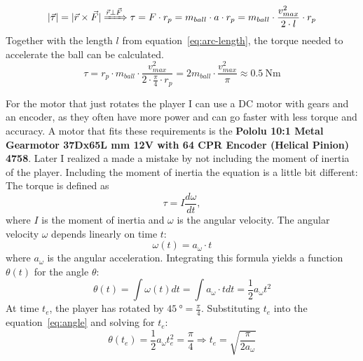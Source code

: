 \begin{equation}
    \label{eq:torque_shoot}
    |\vec{\tau}| = |\vec{r} \times \vec{F}| \xRightarrow{\vec{r} \perp \vec{F}} \tau = F \cdot r_p = m_{ball} \cdot a \cdot r_p = m_{ball} \cdot \frac{v_{max}^2}{2 \cdot l} \cdot r_p
\end{equation}
Together with the length $l$ from equation~\ref{eq:arc-length}, the torque needed to accelerate the ball can be calculated.
\begin{equation}
    \label{eq:torque_shoot_substituted}
    \tau = r_p \cdot m_{ball} \cdot \frac{v_{max}^2}{2\cdot\frac{\pi}{4}\cdot r_p} = 2m_{ball} \cdot \frac{v_{max}^2}{\pi} \approx \qty[per-mode=symbol]{0.5}{\N\m}
\end{equation}



For the motor that just rotates the player I can use a DC motor with gears and an encoder, as they often have more power and can go faster with less torque and accuracy.
A motor that fits these requirements is the \textbf{Pololu 10:1 Metal Gearmotor 37Dx65L mm 12V with 64 CPR Encoder (Helical Pinion) 4758}\autocite{pololu-dc}.
Later I realized a made a mistake by not including the moment of inertia of the player.
Including the moment of inertia the equation is a little bit different:
The torque is defined as
\begin{equation}
    \label{eq:torque2}
    \tau = I \frac{d\omega}{dt},
\end{equation}
where $I$ is the moment of inertia and $\omega$ is the angular velocity.
The angular velocity $\omega$ depends linearly on time $t$:
\begin{equation}
    \label{eq:angular_velocity}
    \omega(t) = a_\omega \cdot t
\end{equation}
where $a_\omega$ is the angular acceleration.
Integrating this formula yields a function $\theta(t)$ for the angle $\theta$:
\begin{equation}
    \label{eq:angle}
    \theta(t) = \int \omega(t)dt = \int a_\omega \cdot t dt = \frac{1}{2} a_\omega t^2
\end{equation}
At time $t_e$, the player has rotated by $\qty[per-mode=symbol]{45}{\degree} = \frac{\pi}{4}$.
Substituting $t_e$ into the equation~\ref{eq:angle} and solving for $t_e$:
\begin{equation}
    \label{eq:time_to_rotate}
   \theta(t_e)= \frac{1}{2} a_\omega t_e^2 = \frac{\pi}{4} \Rightarrow t_e = \sqrt{\frac{\pi}{2a_\omega}}
\end{equation}
